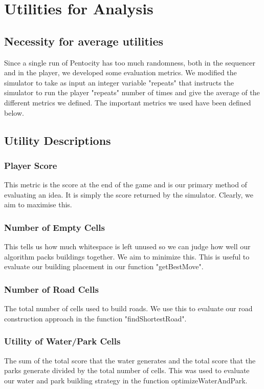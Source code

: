 \section{Utilities for Analysis}
\subsection{Necessity for average utilities}
Since a single run of Pentocity has too much randomness, both in the sequencer and in the player, we developed some evaluation metrics. We modified the simulator to take as input an integer variable "repeats" that instructs the simulator to run the player "repeats" number of times and give the average of the different metrics we defined. The important metrics we used have been defined below.

\subsection{Utility Descriptions}
\subsubsection{Player Score} 
This metric is the score at the end of the game and is our primary method of evaluating an idea. It is simply the score returned by the simulator. Clearly, we aim to maximise this.
\subsubsection{Number of Empty Cells} 
    This tells us how much whitespace is left unused so we can judge how well our algorithm packs buildings together. We aim to minimize this. This is useful to evaluate our building placement in our function "getBestMove".
\subsubsection{Number of Road Cells} 
    The total number of cells used to build roads. We use this to evaluate our road construction approach in the function "findShortestRoad".
\subsubsection{Utility of Water/Park Cells} 
    The sum of the total score that the water generates and the total score that the parks generate divided by the total number of cells. This was used to evaluate our water and park building strategy in the function optimizeWaterAndPark.


